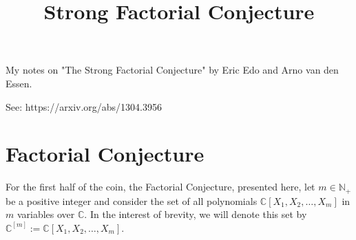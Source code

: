 \documentclass[a4paper]{article}
\title{Strong Factorial Conjecture}
\theoremstyle{definition}
\begin{document}
\tableofcontents

My notes on "The Strong Factorial Conjecture" by Eric Edo and Arno van den Essen.

See: https://arxiv.org/abs/1304.3956

\section{Factorial Conjecture}
%
For the first half of the coin, the Factorial Conjecture, presented here, let \(m \in \mathbb{N}_+\) be a positive integer and consider the set of all polynomials \(\mathbb{C}[X_1, X_2, \ldots, X_m]\) in \(m\) variables over \(\mathbb{C}\). In the interest of brevity, we will denote this set by \(\mathbb{C}^{[m]} := \mathbb{C}[X_1, X_2, \ldots, X_m]\).
\end{document}
